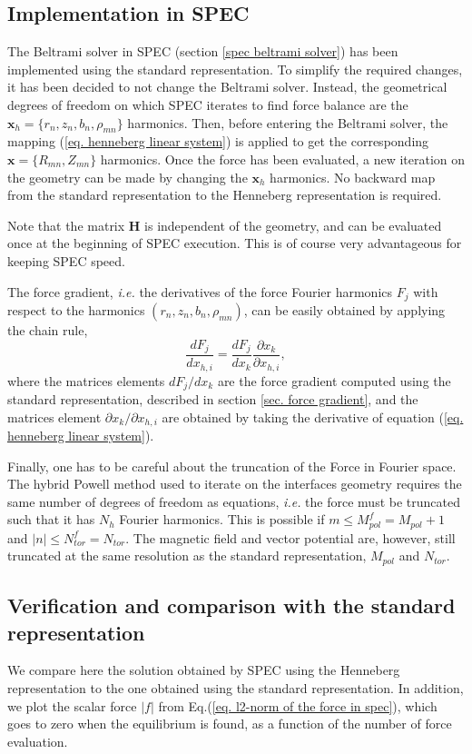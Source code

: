 \documentclass[my_thesis.tex]{subfiles}
\begin{document}
\subsection{Implementation in SPEC}
The Beltrami solver in SPEC (section \ref{spec beltrami solver}) has been implemented using the standard representation. To simplify the required changes, it has been decided to not change the Beltrami solver. Instead, the geometrical degrees of freedom on which SPEC iterates to find force balance are the $\mathbf{x}_h=\{r_n,z_n,b_n,\rho_{mn}\}$ harmonics. Then, before entering the Beltrami solver, the mapping (\ref{eq. henneberg linear system}) is applied to get the corresponding $\mathbf{x}=\{R_{mn},Z_{mn}\}$ harmonics. Once the force has been evaluated, a new iteration on the geometry can be made by changing the $\mathbf{x}_h$ harmonics. No backward map from the standard representation to the Henneberg representation is required.

Note that the matrix $\mathbf{H}$ is independent of the geometry, and can be evaluated once at the beginning of SPEC execution. This is of course very advantageous for keeping SPEC speed.

The force gradient, \textit{i.e.} the derivatives of the force Fourier harmonics $F_j$ with respect to the harmonics $(r_n,z_n,b_n,\rho_{mn})$, can be easily obtained by applying the chain rule,
\begin{equation}
	\frac{dF_j}{dx_{h,i}} = \frac{dF_j}{dx_k}\frac{\partial x_k}{\partial x_{h,i}},
\end{equation}
where the matrices elements $dF_j/dx_k$ are the force gradient computed using the standard representation, described in section \ref{sec. force gradient}, and the matrices element $\partial x_k/\partial x_{h,i}$ are obtained by taking the derivative of equation (\ref{eq. henneberg linear system}).

Finally, one has to be careful about the truncation of the Force in Fourier space. The hybrid Powell method used to iterate on the interfaces geometry requires the same number of degrees of freedom as equations, \textit{i.e.} the force must be truncated such that it has $N_h$ Fourier harmonics. This is possible if $m\leq M^f_{pol}= M_{pol}+1$ and $|n|\leq N^f_{tor}= N_{tor}$. The magnetic field and vector potential are, however, still truncated at the same resolution as the standard representation, $M_{pol}$ and $N_{tor}$.


\subsection{Verification and comparison with the standard representation}
We compare here the solution obtained by SPEC using the Henneberg representation to the one obtained using the standard representation. In addition, we plot the scalar force $|f|$ from Eq.(\ref{eq. l2-norm of the force in spec}), which goes to zero when the equilibrium is found, as a function of the number of force evaluation. 
\end{document}
